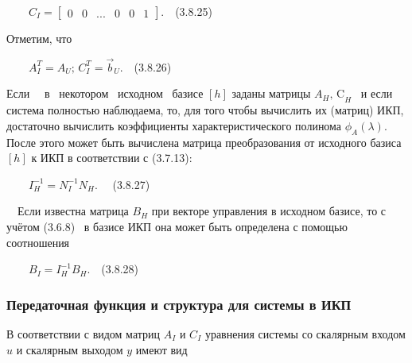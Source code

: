 \documentclass[a4paper]{article}
\begin{document}
{\begin{russian}\sffamily
\ \ \ \  $C_I=\left[\begin{matrix}0&0&...&0&0&1\end{matrix}\right]$.\ \ (3.8.25)
\end{russian}}

{\begin{russian}\sffamily
Отметим, что
\end{russian}}

{\begin{russian}\sffamily
\ \ \ \  $A_I^T=A_U\text{;      }C_I^T=\vec b_U$.\ \ (3.8.26)
\end{russian}}

{\begin{russian}\sffamily
Если \ \ в \ некотором \ исходном \ базисе  $[h]$ заданы матрицы  $A_H\text{,  C}_H$ \ и если система полностью
наблюдаема, то, для того чтобы вычислить их (матриц) ИКП, достаточно вычислить коэффициенты характеристичес­кого
полинома  $ϕ_A(λ)$. После этого может быть вычислена матрица пре­образования от исходного базиса  $[h]$ к ИКП в
соответствии с (3.7.13):
\end{russian}}

{\begin{russian}\sffamily
\ \ \ \  $I_H^{-1}=N_I^{-1}N_H$. \ \ (3.8.27)
\end{russian}}

{\begin{russian}\sffamily
\ \ Если известна матрица  $B_H$ при векторе управления в исходном базисе, то с учётом (3.6.8) \ в базисе ИКП она может
быть определена с помощью соотношения
\end{russian}}

{\begin{russian}\sffamily
\ \ \ \  $B_I=I_H^{-1}B_H$.\ \ (3.8.28) 
\end{russian}}


\bigskip

\subsubsection{Передаточная функция и структура для системы в ИКП}
\hypertarget{RefHeadingToc455659742}{}{\begin{russian}\sffamily
В соответствии с видом матриц  $A_I$ и  $C_I$ уравнения системы со скалярным входом  $u$ и скалярным выходом  $y$ имеют
вид
\end{russian}}
\end{document}
